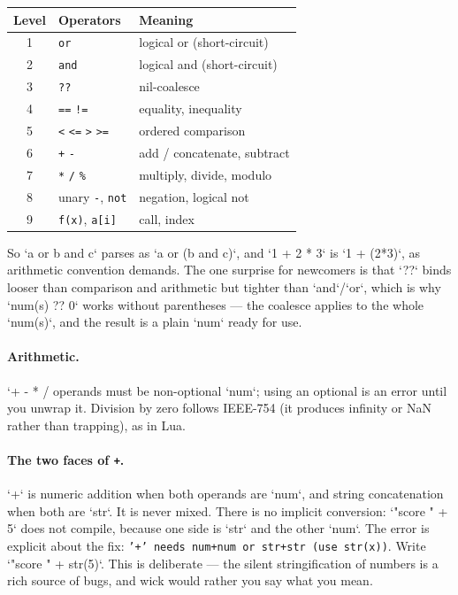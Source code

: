 \begin{center}
\begin{tabular}{@{}cll@{}}
\toprule
\textbf{Level} & \textbf{Operators} & \textbf{Meaning} \\
\midrule
1 & \texttt{or} & logical or (short-circuit) \\
2 & \texttt{and} & logical and (short-circuit) \\
3 & \texttt{??} & nil-coalesce \\
4 & \texttt{==} \quad \texttt{!=} & equality, inequality \\
5 & \texttt{<} \enskip \texttt{<=} \enskip \texttt{>} \enskip \texttt{>=} & ordered comparison \\
6 & \texttt{+} \quad \texttt{-} & add / concatenate, subtract \\
7 & \texttt{*} \enskip \texttt{/} \enskip \texttt{\%} & multiply, divide, modulo \\
8 & unary \texttt{-}, \texttt{not} & negation, logical not \\
9 & \texttt{f(x)}, \texttt{a[i]} & call, index \\
\bottomrule
\end{tabular}
\end{center}

\noindent
So `a or b and c` parses as `a or (b and c)`, and `1 + 2 * 3` is `1 + (2*3)`,
as arithmetic convention demands. The one surprise for newcomers is that `??`
binds looser than comparison and arithmetic but tighter than `and`/`or`, which
is why `num(s) ?? 0` works without parentheses --- the coalesce applies to the
whole `num(s)`, and the result is a plain `num` ready for use.

\paragraph{Arithmetic.} `+ - * / %
operands must be non-optional `num`; using an optional is an error until you
unwrap it. Division by zero follows IEEE-754 (it produces infinity or NaN
rather than trapping), as in Lua.

\paragraph{The two faces of \texttt{+}.} `+` is numeric addition when both
operands are `num`, and string concatenation when both are `str`. It is never
mixed. There is no implicit conversion: `"score " + 5` does not compile,
because one side is `str` and the other `num`. The error is explicit about
the fix: \texttt{'+' needs num+num or str+str (use str(x))}. Write
`"score " + str(5)`. This is deliberate --- the silent stringification of
numbers is a rich source of bugs, and wick would rather you say what you mean.

